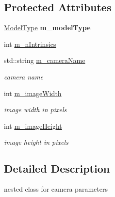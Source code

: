 \subsection*{Protected Attributes}
\begin{DoxyCompactItemize}
\item 
\mbox{\label{classcamodocal_1_1Camera_1_1Parameters_aa30dcba5817719833bfa493df89b37d7}} 
\hyperlink{classcamodocal_1_1Camera_a663bb19b7b1f38f6d1b7eeb0890183ff}{Model\+Type} {\bfseries m\+\_\+model\+Type}
\item 
int \hyperlink{classcamodocal_1_1Camera_1_1Parameters_a241588ca3be399d8baaeda6f663dd793}{m\+\_\+n\+Intrinsics}
\item 
\mbox{\label{classcamodocal_1_1Camera_1_1Parameters_a53e79587ce67111f984b50df4e32961f}} 
std\+::string \hyperlink{classcamodocal_1_1Camera_1_1Parameters_a53e79587ce67111f984b50df4e32961f}{m\+\_\+camera\+Name}
\begin{DoxyCompactList}\small\item\em camera name \end{DoxyCompactList}\item 
\mbox{\label{classcamodocal_1_1Camera_1_1Parameters_a4b85aef06079a1a72f846f0555a370cd}} 
int \hyperlink{classcamodocal_1_1Camera_1_1Parameters_a4b85aef06079a1a72f846f0555a370cd}{m\+\_\+image\+Width}
\begin{DoxyCompactList}\small\item\em image width in pixels \end{DoxyCompactList}\item 
\mbox{\label{classcamodocal_1_1Camera_1_1Parameters_a3add3d0cdc4fdaa3392f08e2f0c1dcb9}} 
int \hyperlink{classcamodocal_1_1Camera_1_1Parameters_a3add3d0cdc4fdaa3392f08e2f0c1dcb9}{m\+\_\+image\+Height}
\begin{DoxyCompactList}\small\item\em image height in pixels \end{DoxyCompactList}\end{DoxyCompactItemize}


\subsection{Detailed Description}
nested class for camera parameters 

